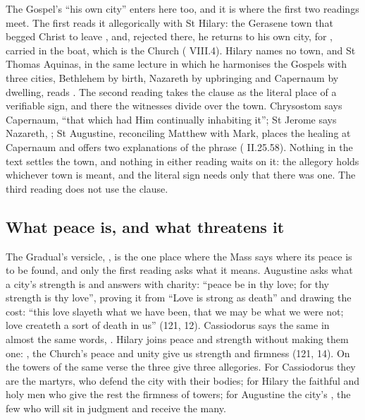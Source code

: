 The Gospel's ``his own city'' enters here too, and it is where the first two
readings meet. The first reads it allegorically with St Hilary: the Gerasene
town that begged Christ to leave , and,
rejected there, he returns to his own city, for , carried in the boat, which is the Church ( VIII.4). Hilary names no town, and St Thomas Aquinas, in the same
lecture in which he harmonises the Gospels with three cities, Bethlehem by
birth, Nazareth by upbringing and Capernaum by dwelling, reads . The second reading takes the clause
as the literal place of a verifiable sign, and there the witnesses divide over
the town. Chrysostom says Capernaum, ``that which had Him continually
inhabiting it''; St Jerome says Nazareth, ; St Augustine, reconciling Matthew with Mark, places the healing at
Capernaum and offers two explanations of the phrase ( II.25.58). Nothing in the text settles the town, and nothing
in either reading waits on it: the allegory holds whichever town is meant, and the
literal sign needs only that there was one. The third reading does not use the
clause.

\subsection{What peace is, and what threatens it}

The Gradual's versicle, , is the one place where
the Mass says where its peace is to be found, and only the first reading asks
what it means. Augustine asks what a city's strength is and answers with
charity: ``peace be in thy love; for thy strength is thy love'', proving it from
``Love is strong as death'' and drawing the cost: ``this love slayeth what we
have been, that we may be what we were not; love createth a sort of death in
us'' (121, 12). Cassiodorus says the same in almost the same words,
. Hilary joins peace and strength without making them one:
, the
Church's peace and unity give us strength and firmness (121, 14). On the towers
of the same verse the three give three allegories. For Cassiodorus they are the
martyrs, who defend the city with their bodies; for Hilary the faithful and holy
men who give the rest the firmness of towers; for Augustine the city's
, the few who will sit in judgment and receive the many.

